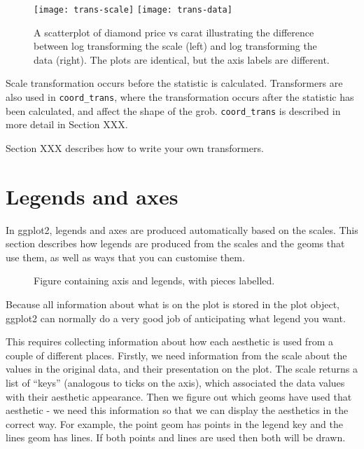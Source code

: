 \begin{figure}[htbp]
  \centering
    \texttt{[image: trans-scale]}
    \texttt{[image: trans-data]}
  \caption{A scatterplot of diamond price vs carat illustrating the difference between log transforming the scale (left) and log transforming the data (right).  The plots are identical, but the axis labels are different.}
  \label{fig:trans}
\end{figure}

Scale transformation occurs before the statistic is calculated.  Transformers are also used in \verb|coord_trans|, where the transformation occurs after the statistic has been calculated, and affect the shape of the grob.  \verb|coord_trans| is described in more detail in Section XXX.

Section XXX describes how to write your own transformers.

\section{Legends and axes}
\label{sec:legends_and_axes}

In ggplot2, legends and axes are produced automatically based on the scales.  This section describes how legends are produced from the scales and the geoms that use them, as well as ways that you can customise them.

\begin{figure}[htbp]
  \centering
  \caption{Figure containing axis and legends, with pieces labelled.  }
  \label{fig:label}
\end{figure}

Because all information about what is on the plot is stored in the plot object, ggplot2 can normally do a very good job of anticipating what legend you want.  

This requires collecting information about how each aesthetic is used from a couple of different places.  Firstly, we need information from the scale about the values in the original data, and their presentation on the plot.  The scale returns a list of ``keys'' (analogous to ticks on the axis), which associated the data values with their aesthetic appearance.  Then we figure out which geoms have used that aesthetic - we need this information so that we can display the aesthetics in the correct way.  For example, the point geom has points in the legend key and the lines geom has lines.  If both points and lines are used then both will be drawn.

